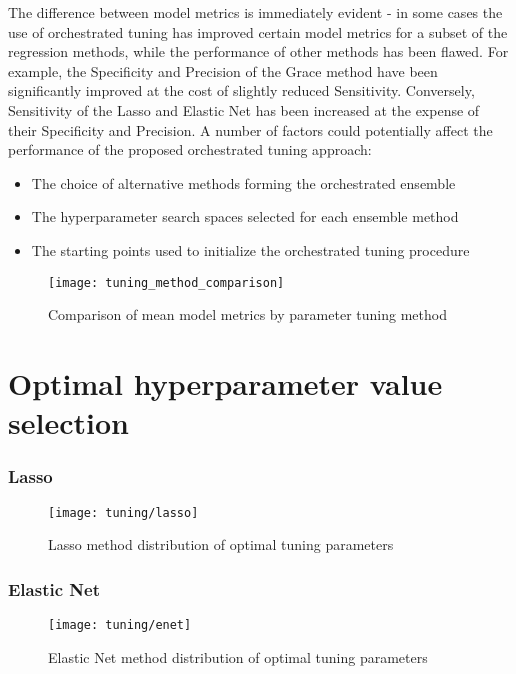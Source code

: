 

The difference between model metrics is immediately evident - in some cases the use of orchestrated tuning has improved certain model metrics for a subset of the regression methods, while the performance of other methods has been flawed. For example, the Specificity and Precision of the Grace method have been significantly improved at the cost of slightly reduced Sensitivity. Conversely, Sensitivity of the Lasso and Elastic Net has been increased at the expense of their Specificity and Precision. A number of factors could potentially affect the performance of the proposed orchestrated tuning approach:
\begin{itemize}
	\item The choice of alternative methods forming the orchestrated ensemble
	\item The hyperparameter search spaces selected for each ensemble method
	\item The starting points used to initialize the orchestrated tuning procedure
\end{itemize}

\begin{figure}[H]
	\centering
	\texttt{[image: tuning\_method\_comparison]}
	\caption{Comparison of mean model metrics by parameter tuning method}
	\label{fig:met_comp}
\end{figure}

\section{Optimal hyperparameter value selection}

\subsubsection{Lasso}
\begin{figure}[H]
	\centering
	\texttt{[image: tuning/lasso]}
	\caption{Lasso method distribution of optimal tuning parameters}
	\label{fig:tun_lasso}
\end{figure}

\subsubsection{Elastic Net}
\begin{figure}[H]
	\centering
	\texttt{[image: tuning/enet]}
	\caption{Elastic Net method distribution of optimal tuning parameters}
	\label{fig:tun_enet}
\end{figure}

